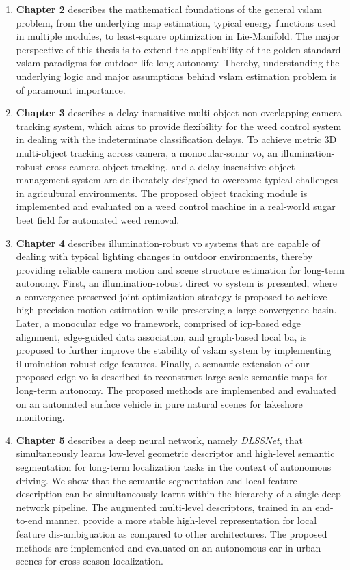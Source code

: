 \begin{enumerate}
	\item \textbf{Chapter 2} describes the mathematical foundations of the general \acrshort{vslam} problem, from the underlying \acrshort{map} estimation, typical energy functions used in multiple modules, to least-square optimization in Lie-Manifold. The major perspective of this thesis is to extend the applicability of the golden-standard \acrshort{vslam} paradigms for outdoor life-long autonomy. Thereby, understanding the underlying logic and major assumptions behind \acrshort{vslam} estimation problem is of paramount importance.
	\item \textbf{Chapter 3} describes a delay-insensitive multi-object non-overlapping camera tracking system, which aims to provide flexibility for the weed control system in dealing with the indeterminate classification delays. To achieve metric 3D multi-object tracking across camera, a monocular-sonar \acrshort{vo}, an illumination-robust cross-camera object tracking, and a delay-insensitive object management system are deliberately designed to overcome typical challenges in agricultural environments. The proposed object tracking module is implemented and evaluated on a weed control machine in a real-world sugar beet field for automated weed removal. 
	\item \textbf{Chapter 4} describes illumination-robust \acrshort{vo} systems that are capable of dealing with typical lighting changes in outdoor environments, thereby providing reliable camera motion and scene structure estimation for long-term autonomy. First, an illumination-robust direct \acrshort{vo} system is presented, where a convergence-preserved joint optimization strategy is proposed to achieve high-precision motion estimation while preserving a large convergence basin. Later, a monocular edge \acrshort{vo} framework, comprised of \acrshort{icp}-based edge alignment, edge-guided data association, and graph-based local \acrshort{ba}, is proposed to further improve the stability of \acrshort{vslam} system by implementing illumination-robust edge features. Finally, a semantic extension of our proposed edge \acrshort{vo} is described to reconstruct large-scale semantic maps for long-term autonomy. The proposed methods are implemented and evaluated on an automated surface vehicle in pure natural scenes for lakeshore monitoring.
	\item \textbf{Chapter 5} describes a deep neural network, namely {\em DLSSNet}, that simultaneously learns low-level geometric descriptor and high-level semantic segmentation for long-term localization tasks in the context of autonomous driving. We show that the semantic segmentation and local feature description can be simultaneously learnt within the hierarchy of a single deep network pipeline. The augmented multi-level descriptors, trained in an end-to-end manner, provide a more stable high-level representation for local feature dis-ambiguation as compared to other architectures. The proposed methods are implemented and evaluated on an autonomous car in urban scenes for cross-season localization.

\end{enumerate}
